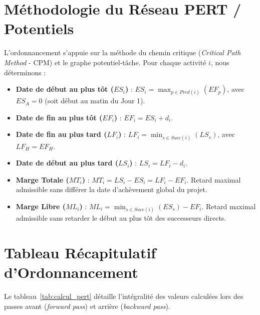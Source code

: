 \documentclass[a4paper,12pt]{report}
\begin{document}
	\section{Méthodologie du Réseau PERT / Potentiels}
	L'ordonnancement s'appuie sur la méthode du chemin critique (\textit{Critical Path Method} - CPM) et le graphe potentiel-tâche. Pour chaque activité $i$, nous déterminons :
	\begin{itemize}[leftmargin=1.2cm, noitemsep]
		\item \textbf{Date de début au plus tôt ($ES_i$)} : $ES_i = \max_{p \in Pred(i)} (EF_p)$, avec $ES_A = 0$ (soit début au matin du Jour 1).
		\item \textbf{Date de fin au plus tôt ($EF_i$)} : $EF_i = ES_i + d_i$.
		\item \textbf{Date de fin au plus tard ($LF_i$)} : $LF_i = \min_{s \in Succ(i)} (LS_s)$, avec $LF_H = EF_H$.
		\item \textbf{Date de début au plus tard ($LS_i$)} : $LS_i = LF_i - d_i$.
		\item \textbf{Marge Totale ($MT_i$)} : $MT_i = LS_i - ES_i = LF_i - EF_i$. Retard maximal admissible sans différer la date d'achèvement global du projet.
		\item \textbf{Marge Libre ($ML_i$)} : $ML_i = \min_{s \in Succ(i)} (ES_s) - EF_i$. Retard maximal admissible sans retarder le début au plus tôt des successeurs directs.
	\end{itemize}
	
	\section{Tableau Récapitulatif d'Ordonnancement}
	Le tableau~\ref{tab:calcul_pert} détaille l'intégralité des valeurs calculées lors des passes avant (\textit{forward pass}) et arrière (\textit{backward pass}).
	
\end{document}
